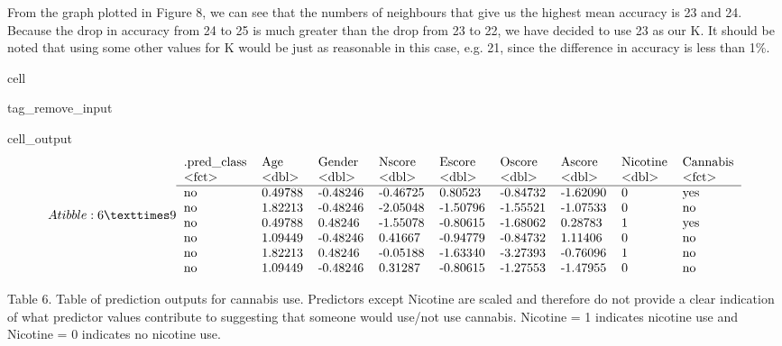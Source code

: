\documentclass[letterpaper,10pt,english]{jupyterBook}
\begin{document}
\sphinxAtStartPar
From the graph plotted in Figure 8, we can see that the numbers of neighbours that give us the highest mean accuracy is 23 and 24. Because the drop in accuracy from 24 to 25 is much greater than the drop from 23 to 22, we have decided to use 23 as our K. It should be noted that using some other values for K would be just as reasonable in this case, e.g. 21, since the difference in accuracy is less than 1\%.

\begin{sphinxuseclass}{cell}
\begin{sphinxuseclass}{tag_remove_input}\begin{sphinxVerbatimOutput}

\begin{sphinxuseclass}{cell_output}\begin{equation*}
\begin{split}A tibble: 6 × 9
\begin{tabular}{lllllllll}
 .pred\_class & Age & Gender & Nscore & Escore & Oscore & Ascore & Nicotine & Cannabis\\
 <fct> & <dbl> & <dbl> & <dbl> & <dbl> & <dbl> & <dbl> & <dbl> & <fct>\\
\hline
	 no & 0.49788 & -0.48246 & -0.46725 &  0.80523 & -0.84732 & -1.62090 & 0 & yes\\
	 no & 1.82213 & -0.48246 & -2.05048 & -1.50796 & -1.55521 & -1.07533 & 0 & no \\
	 no & 0.49788 &  0.48246 & -1.55078 & -0.80615 & -1.68062 &  0.28783 & 1 & yes\\
	 no & 1.09449 & -0.48246 &  0.41667 & -0.94779 & -0.84732 &  1.11406 & 0 & no \\
	 no & 1.82213 &  0.48246 & -0.05188 & -1.63340 & -3.27393 & -0.76096 & 1 & no \\
	 no & 1.09449 & -0.48246 &  0.31287 & -0.80615 & -1.27553 & -1.47955 & 0 & no \\
\end{tabular}\end{split}
\end{equation*}
\end{sphinxuseclass}\end{sphinxVerbatimOutput}

\end{sphinxuseclass}
\end{sphinxuseclass}
\sphinxAtStartPar
Table 6. Table of prediction outputs for cannabis use. Predictors except Nicotine are scaled and therefore do not provide a clear indication of what predictor values contribute to suggesting that someone would use/not use cannabis. Nicotine = 1 indicates nicotine use and Nicotine = 0 indicates no nicotine use.
\end{document}
